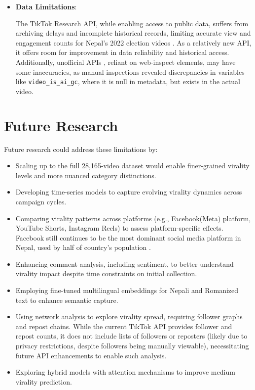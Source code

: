 \documentclass[12pt,a4paper]{report}
\begin{document}
\begin{itemize}
    \item \textbf{Data Limitations}:

    The TikTok Research API, while enabling access to public data, suffers from archiving delays and incomplete historical records, limiting accurate view and engagement counts for Nepal’s 2022 election videos \parencite{tiktokResearchAPI2025}. As a relatively new API, it offers room for improvement in data reliability and historical access. Additionally, unofficial APIs \parencite{QBukold2025TikTokScraper}, reliant on web-inspect elements, may have some inaccuracies, as manual inspections revealed discrepancies in variables like \texttt{video\_is\_ai\_gc}, where it is null in metadata, but exists in the actual video.
    
\end{itemize}


\newpage
\section{Future Research}
    Future research could address these limitations by:
    \begin{itemize}
        \item Scaling up to the full 28,165-video dataset would enable finer-grained virality levels and more nuanced category distinctions.
        \item Developing time-series models to capture evolving virality dynamics across campaign cycles.
        \item Comparing virality patterns across platforms (e.g., Facebook(Meta) platform, YouTube Shorts, Instagram Reels) to assess platform-specific effects. Facebook still continues to be the most dominant social media platform in Nepal, used by half of country's population \parencite{napoleoncat2025}.
        \item Enhancing comment analysis, including sentiment, to better understand virality impact despite time constraints on initial collection.
        \item Employing fine-tuned multilingual embeddings for Nepali and Romanized text to enhance semantic capture.
        \item Using network analysis to explore virality spread, requiring follower graphs and repost chains. While the current TikTok API provides follower and repost counts, it does not include lists of followers or reposters (likely due to privacy restrictions, despite followers being manually viewable), necessitating future API enhancements to enable such analysis.
        \item Exploring hybrid models with attention mechanisms to improve medium virality prediction.
    \end{itemize}
\end{document}
